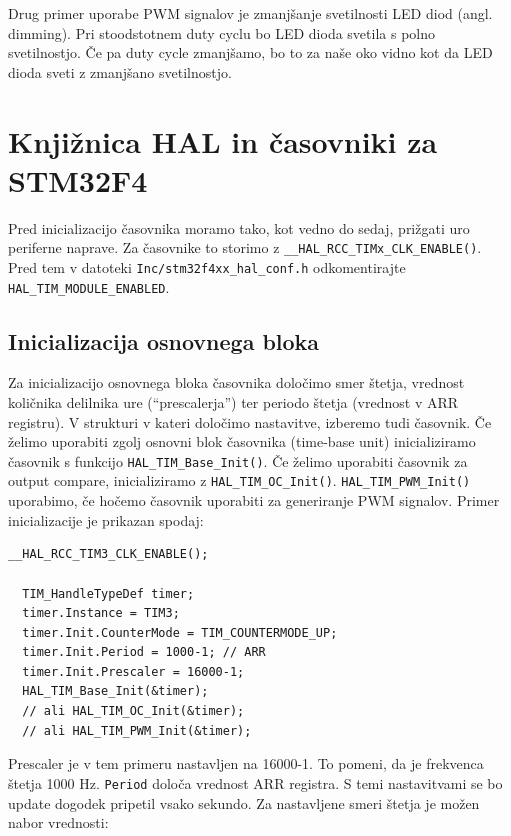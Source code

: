 \documentclass[12pt,letterpaper]{article}
\begin{document}
Drug primer uporabe PWM signalov je zmanjšanje svetilnosti LED diod (angl. dimming). Pri stoodstotnem duty cyclu bo LED dioda svetila s polno svetilnostjo. Če pa duty cycle zmanjšamo, bo to za naše oko vidno kot da LED dioda sveti z zmanjšano svetilnostjo.


\section*{Knjižnica HAL in časovniki za STM32F4}

Pred inicializacijo časovnika moramo tako, kot vedno do sedaj, prižgati uro periferne naprave. Za časovnike to storimo z \texttt{\_\_HAL\_RCC\_TIMx\_CLK\_ENABLE()}. Pred tem v datoteki \texttt{Inc/stm32f4xx\_hal\_conf.h} odkomentirajte \texttt{HAL\_TIM\_MODULE\_ENABLED}.

\subsection*{Inicializacija osnovnega bloka}

Za inicializacijo osnovnega bloka časovnika določimo smer štetja, vrednost količnika delilnika ure (``prescalerja'') ter periodo štetja (vrednost v ARR registru). V strukturi v kateri določimo nastavitve, izberemo tudi časovnik. Če želimo uporabiti zgolj osnovni blok časovnika (time-base unit) inicializiramo časovnik s funkcijo \texttt{HAL\_TIM\_Base\_Init()}. Če želimo uporabiti časovnik za output compare, inicializiramo z \texttt{HAL\_TIM\_OC\_Init()}. \texttt{HAL\_TIM\_PWM\_Init()} uporabimo, če hočemo časovnik uporabiti za generiranje PWM signalov. Primer inicializacije je prikazan spodaj:

\begin{center}
\begin{lstlisting}[style=CStyle]
  __HAL_RCC_TIM3_CLK_ENABLE();

  TIM_HandleTypeDef timer;
  timer.Instance = TIM3;
  timer.Init.CounterMode = TIM_COUNTERMODE_UP;
  timer.Init.Period = 1000-1; // ARR 
  timer.Init.Prescaler = 16000-1;
  HAL_TIM_Base_Init(&timer);
  // ali HAL_TIM_OC_Init(&timer);
  // ali HAL_TIM_PWM_Init(&timer);
\end{lstlisting}
\end{center}

Prescaler je v tem primeru nastavljen na 16000-1. To pomeni, da je frekvenca štetja 1000 Hz. \texttt{Period} določa vrednost ARR registra. S temi nastavitvami se bo update dogodek pripetil vsako sekundo. Za nastavljene smeri štetja je možen nabor vrednosti:
\end{document}
